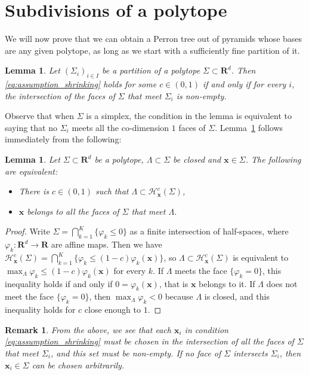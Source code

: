 \documentclass[10pt]{amsart}
\newcommand{\R}{\mathbf{R}}
\newtheorem{lemma}[theorem]{Lemma}
\newtheorem{remark}[theorem]{Remark}
\begin{document}
\begin{appendix}\label{appendix}
\section{Subdivisions of a  polytope}
We will now prove that we can obtain a Perron tree out of pyramids whose bases are any given  polytope, as long as we start with a sufficiently fine partition of it.

\begin{lemma}\label{lem:NSC_for_shrinking}
Let $(\Sigma_i)_{i \in I}$ be a partition of a polytope $\Sigma\subset \R^d$. Then \eqref{eq:assumption_shrinking} holds for some $c\in (0,1)$ if and only if for every $i$, the intersection of the faces of $\Sigma$ that meet $\Sigma_i$ is non-empty.
\end{lemma}
Observe that when $\Sigma$ is a simplex, the condition in the lemma is equivalent to saying that no $\Sigma_i$ meets all the co-dimension $1$ faces of $\Sigma$. Lemma~\ref{lem:NSC_for_shrinking} follows immediately from the following:
\begin{lemma}
Let $\Sigma \subset \R^d$ be a polytope, $\Lambda \subset \Sigma$ be closed and $\mathbf{x} \in \Sigma$. The following are equivalent:
\begin{itemize}
    \item There is $c \in (0,1)$ such that $\Lambda \subset \mathcal{H}_{\mathbf{x}}^c(\Sigma)$,
    \item $\mathbf x$ belongs to all the faces of $\Sigma$ that meet $\Lambda$.
\end{itemize}
\end{lemma}
\begin{proof} Write $\Sigma = \bigcap_{k=1}^K \{\varphi_k \leq 0\}$ as a finite intersection of half-spaces, where $\varphi_k:\R^d \to \R$ are affine maps. Then we have $\mathcal{H}_{\mathbf{x}}^c(\Sigma) = \bigcap_{k=1}^K \{\varphi_k \leq (1-c) \varphi_k(\mathbf{x})\}$, so $\Lambda \subset \mathcal{H}_{\mathbf{x}}^c(\Sigma)$ is equivalent to $\max_\Lambda \varphi_k \leq (1-c) \varphi_k(\mathbf{x})$ for every $k$. If $\Lambda$ meets the face $\{\varphi_k=0\}$, this inequality holds if and only if $0 =\varphi_k(\mathbf{x})$, that is $\mathbf{x}$ belongs to it. If $\Lambda$ does not meet the face $\{\varphi_k=0\}$, then $\max_\Lambda \varphi_k<0$ because $\Lambda$ is closed, and this inequality holds for $c$ close enough to $1$.
\end{proof}
\begin{remark}\label{rem: choice point}
From the above, we see that each $\mathbf{x}_i$ in condition \eqref{eq:assumption_shrinking} must be chosen in the intersection of all the faces of $\Sigma$ that meet $\Sigma_i$, and this set must be non-empty. If no face of $\Sigma$ intersects $\Sigma_i$, then $\mathbf{x}_i\in \Sigma$ can be chosen arbitrarily. 
\end{remark}


\end{appendix}
\end{document}
